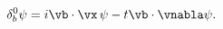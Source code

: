 \begin{equation}
     \delta^{0}_{b}\psi=i\vb\cdot\vx\,\psi-t\vb\cdot\vnabla\psi.
     \label{convbimp}
\end{equation}

